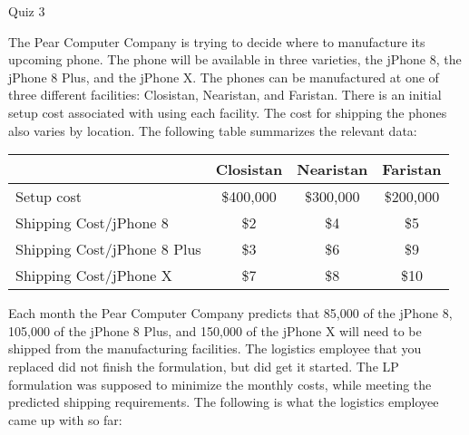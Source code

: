 \documentclass[10pt]{article}
\begin{document}
\begin{center}
  {\sc Quiz 3}\\
\end{center}

\noindent
The Pear Computer Company is trying to decide where to manufacture its upcoming phone.  The phone will be available in three varieties, the jPhone 8, the jPhone 8 Plus, and the jPhone X.  The phones can be manufactured at one of three different facilities:  Closistan, Nearistan, and Faristan.  There is an initial setup cost associated with using each facility.  The cost for shipping the phones also varies by location.  The following table summarizes the relevant data:

\begin{center}
\begin{tabular}{l|c|c|c}
   & Closistan  & Nearistan & Faristan \\
  \hline 
  Setup cost & \$400,000 & \$300,000 & \$200,000 \\
  \hline 
  Shipping Cost/jPhone 8 & \$2 & \$4 & \$5 \\
  \hline
  Shipping Cost/jPhone 8 Plus & \$3 & \$6 & \$9 \\
  \hline
  Shipping Cost/jPhone X & \$7 & \$8 & \$10 \\
  \hline
\end{tabular}
\end{center}

\bigskip
\noindent
Each month the Pear Computer Company predicts that 85,000 of the jPhone 8, 105,000 of the jPhone 8 Plus, and 150,000 of the jPhone X will need to be shipped from the manufacturing facilities.  The logistics employee that you replaced did not finish the formulation, but did get it started.  The LP formulation was supposed to minimize the monthly costs, while meeting the predicted shipping requirements. The following is what the logistics employee came up with so far:
\end{document}
